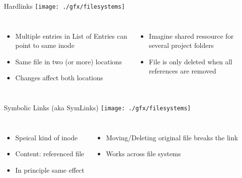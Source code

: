 
\begin{frame}{Hardlinks}
%
\texttt{[image: ./gfx/filesystems]}
%
\begin{columns}
	\begin{itemize}
	\item Multiple entries in List of Entries can point to same inode
	\item[\Thus] Same file in two (or more) locations
	\item Changes affect both locations
	\end{itemize}
%
	\begin{itemize}
	\item Imagine shared ressource for several project folders
	\item File is only deleted when all references are removed
	\end{itemize}
\end{columns}
%
\end{frame}


\begin{frame}{Symbolic Links (aka SymLinks)}
%
\texttt{[image: ./gfx/filesystems]}
%
\begin{columns}
	\begin{itemize}
	\item Speical kind of inode
	\item Content: referenced file
	\item In principle same effect
	\end{itemize}
%
	\begin{itemize}
	\item Moving/Deleting original file breaks the link
	\item Works across file systems
	\end{itemize}
\end{columns}
%
\end{frame}


